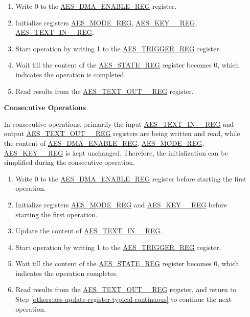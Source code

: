 \documentclass[main\_\_EN.tex]{subfiles}
\begin{document}
\begin{enumerate}
    \item Write 0 to the \hyperref[regdesc:AESDMAENABLEREG]{AES\_DMA\_ENABLE\_REG} register.
    \item Initialize registers \hyperref[regdesc:AESMODEREG]{AES\_MODE\_REG}, \hyperref[regdesc:AESKEYnREG]{AES\_KEY\_\_REG}, \hyperref[regdesc:AESTEXTINnREG]{AES\_TEXT\_IN\_\_REG}.
    \item Start operation by writing 1 to the \hyperref[regdesc:AESTRIGGERREG]{AES\_TRIGGER\_REG} register.
    \item Wait till the content of the \hyperref[regdesc:AESSTATEREG]{AES\_STATE\_REG} register becomes 0, which indicates the operation is completed.
    \item Read results from the \hyperref[regdesc:AESTEXTOUTnREG]{AES\_TEXT\_OUT\_\_REG} register.
\end{enumerate}

\textbf{Consecutive Operations}

In consecutive operations, primarily the input \hyperref[regdesc:AESTEXTINnREG]{AES\_TEXT\_IN\_\_REG} and output \hyperref[regdesc:AESTEXTOUTnREG]{AES\_TEXT\_OUT\_\_REG} registers are being written and read, while the content of \hyperref[regdesc:AESDMAENABLEREG]{AES\_DMA\_ENABLE\_REG}, \hyperref[regdesc:AESMODEREG]{AES\_MODE\_REG}, \hyperref[regdesc:AESKEYnREG]{AES\_KEY\_\_REG}
is kept unchanged. Therefore, the initialization can be simplified during the consecutive operation.

\begin{enumerate}
    \item Write 0 to the \hyperref[regdesc:AESDMAENABLEREG]{AES\_DMA\_ENABLE\_REG} register before starting the first operation.
    \item Initialize registers \hyperref[regdesc:AESMODEREG]{AES\_MODE\_REG} and \hyperref[regdesc:AESKEYnREG]{AES\_KEY\_\_REG}
    before starting the first operation. 
    \item Update the content of \hyperref[regdesc:AESTEXTINnREG]{AES\_TEXT\_IN\_\_REG}. \label{others:aes-update-register-typical-continuous}
    \item Start operation by writing 1 to the \hyperref[regdesc:AESTRIGGERREG]{AES\_TRIGGER\_REG} register.
    \item Wait till the content of the \hyperref[regdesc:AESSTATEREG]{AES\_STATE\_REG} register becomes 0, which indicates the operation completes.
    \item Read results from the \hyperref[regdesc:AESTEXTOUTnREG]{AES\_TEXT\_OUT\_\_REG} register, \label{read result in typical AES continuous calculation} and return to Step \ref{others:aes-update-register-typical-continuous} to continue the next operation.
\end{enumerate}
\end{document}
